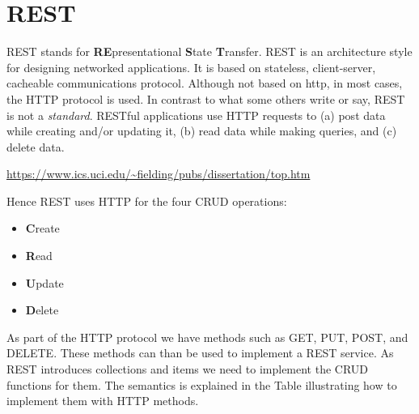 

\chapter{REST}

REST stands for {\bf RE}presentational {\bf S}tate {\bf
  T}ransfer. REST is an architecture style for designing networked
applications. It is based on stateless, client-server, cacheable
communications protocol. Although not based on http, in most cases,
the HTTP protocol is used. In contrast to what some others write or
say, REST is not a \emph{standard}. RESTful applications use HTTP
requests to (a) post data while creating and/or updating it, (b) read
data while making queries, and (c) delete data.

\url{https://www.ics.uci.edu/~fielding/pubs/dissertation/top.htm}

Hence REST uses HTTP for the four CRUD operations:

\begin{itemize}
\item  {\bf C}reate
\item  {\bf R}ead
\item  {\bf U}pdate
\item  {\bf D}elete
\end{itemize}

As part of the HTTP protocol we have methods such as GET, PUT, POST, and
DELETE. These methods can than be used to implement a REST service. As
REST introduces collections and items we need to implement the CRUD
functions for them. The semantics is explained in the Table
illustrating how to implement them with HTTP methods.

